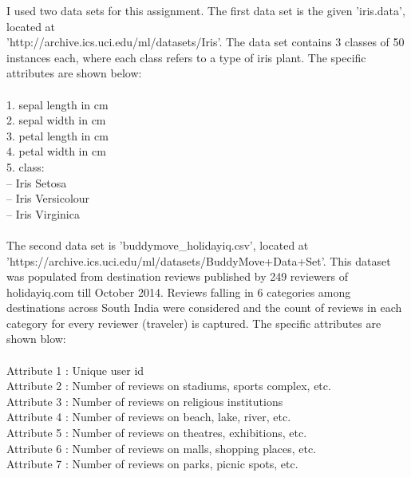 \documentclass[9pt,twoside]{exam}
\begin{document}
I used two data sets for this assignment. The first data set is the given 'iris.data', located at \\
'http://archive.ics.uci.edu/ml/datasets/Iris'. The data set contains 3 classes of 50 instances each, where each class refers to a type of iris plant. The specific attributes are shown below: \\\\
1. sepal length in cm \\
2. sepal width in cm \\
3. petal length in cm \\
4. petal width in cm \\
5. class: \\
-- Iris Setosa \\
-- Iris Versicolour \\
-- Iris Virginica\\
\\
The second data set is 'buddymove\_holidayiq.csv', located at \\
'https://archive.ics.uci.edu/ml/datasets/BuddyMove+Data+Set'. This dataset was populated from destination reviews published by 249 reviewers of holidayiq.com till October 2014. Reviews falling in 6 categories among destinations across South India were considered and the count of reviews in each category for every reviewer (traveler) is captured. The specific attributes are shown blow: \\\\
Attribute 1 : Unique user id\\
Attribute 2 : Number of reviews on stadiums, sports complex, etc.\\
Attribute 3 : Number of reviews on religious institutions\\
Attribute 4 : Number of reviews on beach, lake, river, etc.\\
Attribute 5 : Number of reviews on theatres, exhibitions, etc.\\
Attribute 6 : Number of reviews on malls, shopping places, etc.\\
Attribute 7 : Number of reviews on parks, picnic spots, etc.\\
\\
\end{document}
